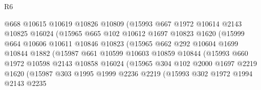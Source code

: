 \begin{lexlean}{R6}
\begin{coremodule}
                          @668
                          @10615
                          @10619
                          @10826
                          @10809
                          (@15993
                            @667
                            @1972
                            @10614
                            @2143
                            @10825
                            @16024
                            (@15965
                              @665
                              @102
                              @10612
                              @1697
                              @10823
                              @1620
                              (@15999
                                @664
                                @10606
                                @10611
                                @10846
                                @10823
                                (@15965
                                  @662
                                  @292
                                  @10604
                                  @1699
                                  @10844
                                  @1882
                                  (@15987
                                    @661
                                    @10599
                                    @10603
                                    @10859
                                    @10844
                                    (@15993
                                      @660
                                      @1972
                                      @10598
                                      @2143
                                      @10858
                                      @16024
                                      (@15965
                                        @304
                                        @102
                                        @2000
                                        @1697
                                        @2219
                                        @1620
                                        (@15987
                                          @303
                                          @1995
                                          @1999
                                          @2236
                                          @2219
                                          (@15993
                                            @302
                                            @1972
                                            @1994
                                            @2143
                                            @2235

\end{coremodule}
\end{lexlean}
